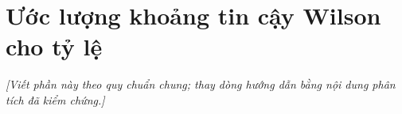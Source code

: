 \section{Ước lượng khoảng tin cậy Wilson cho tỷ lệ}
\noindent\textit{[Viết phần này theo quy chuẩn chung; thay dòng hướng dẫn bằng nội dung phân tích đã kiểm chứng.]}


